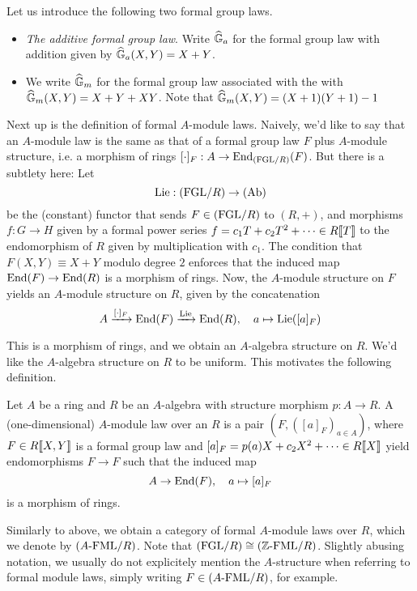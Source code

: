\documentclass[../main.tex]{subfiles}
\begin{document}
\begin{xpl} Let us introduce the following two formal group laws.
  \begin{itemize}
    \item \textit{The additive formal group law}. Write 
      $\widehat{\mathbb{G}}_a$ for the formal group law with addition given by 
      $\widehat{\mathbb{G}}_a(X,Y) = X + Y$. 
    \item We write $\widehat{\mathbb{G}}_m$ for the formal group law associated with the 
      with $\widehat{\mathbb{G}}_m(X,Y) = X + Y + XY$. Note that $\widehat{\mathbb{G}}_m(X,Y) = (X+1)(Y+1) - 1$
  \end{itemize}
\end{xpl}

Next up is the definition of formal $A$-module laws. Naively, we'd like to say
that an $A$-module law is the same as that of a formal group law $F$
plus $A$-module structure, i.e. a morphism of rings $[\cdot]_F: A \to
\operatorname{End}_{(\mathrm{FGL}/{R})}(F)$. But there is a subtlety here: Let 
\begin{equation*}
  \operatorname{Lie}: {(\mathrm{FGL}/{R})} \to {(\mathrm{Ab})} 
\end{equation*}
be the (constant) functor that sends $F \in {(\mathrm{FGL}/{R})}$ to $(R,+)$, and morphisms
$f: G \to H$ given by a formal power series
$f = c_1 T + c_2 T^2 + \dots \in R\llbracket T \rrbracket$ to the endomorphism
of $R$ given by multiplication with $c_1$. The condition that 
$F(X,Y) \equiv X+Y$ modulo degree $2$ enforces that the induced map
$\operatorname{End}(F) \to \operatorname{End}(R)$ is a morphism of rings. Now, the $A$-module structure on $F$ 
yields an $A$-module structure on $R$, given by the concatenation\begin{equation*}
  A \xrightarrow{[\cdot]_F} \operatorname{End}(F) \xrightarrow{\operatorname{Lie}} \operatorname{End}(R), \quad a \mapsto \operatorname{Lie}([a]_F)
\end{equation*}

This is a morphism of rings, and we obtain an $A$-algebra structure on $R$. We'd
like the $A$-algebra structure on $R$ to be uniform. This
motivates the following definition.
\begin{defi}
  Let $A$ be a ring and $R$ be an $A$-algebra with structure
  morphism $p: A \to R$. A (one-dimensional) $A$-module law over an $R$ is a
  pair $(F, ([a]_F)_{a \in A})$, where $F \in R\llbracket X,Y \rrbracket$ is 
  a formal group law and $[a]_F = p(a)X + c_2X^2 + \dots 
  \in R\llbracket X \rrbracket$ yield endomorphisms $F \to F$ such that the induced map
  \begin{equation*}
    A \to \operatorname{End}(F), \quad a \mapsto [a]_F 
  \end{equation*}
  is a morphism of rings.
\end{defi}
Similarly to above, we obtain a category of formal $A$-module laws over $R$,
which we denote by ${({A}\text-\mathrm{FML}/{R})}$. Note that ${(\mathrm{FGL}/{R})} \cong {({\mathbb{Z}}\text-\mathrm{FML}/{R})}$.
Slightly abusing notation, we usually do not explicitely mention the $A$-structure
when referring to formal module laws, simply writing $F \in {({A}\text-\mathrm{FML}/{R})}$, for
example. 
\end{document}
